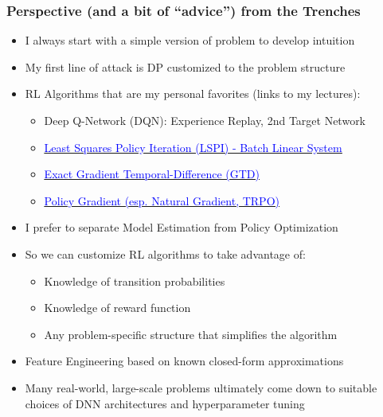 \documentclass[handout]{beamer}
\begin{document}
\begin{frame}
\frametitle{Perspective (and a bit of ``advice'') from the Trenches}
\pause
\begin{itemize}[<+->]
\item I always start with a simple version of problem to develop intuition
\item My first line of attack is DP customized to the problem structure
\item RL Algorithms that are my personal favorites (links to my lectures):
\begin{itemize}
\item Deep Q-Network (DQN): Experience Replay, 2nd Target Network
\item \href{https://github.com/coverdrive/technical-documents/blob/master/finance/cme241/ValueFunctionGeometry.pdf}{\underline{\textcolor{blue}{Least Squares Policy Iteration (LSPI) - Batch Linear System}}}
\item \href {https://github.com/coverdrive/technical-documents/blob/master/finance/cme241/ValueFunctionGeometry.pdf}{\underline{\textcolor{blue}{Exact Gradient Temporal-Difference (GTD)}}}
\item \href{https://github.com/coverdrive/technical-documents/blob/master/finance/cme241/PolicyGradient.pdf}{\underline{\textcolor{blue}{Policy Gradient (esp. Natural Gradient, TRPO)}}}
\end{itemize}
\item I prefer to separate Model Estimation from Policy Optimization
\item So we can customize RL algorithms to take advantage of:
\begin{itemize}
\item Knowledge of transition probabilities
\item Knowledge of reward function
\item Any problem-specific structure that simplifies the algorithm
\end{itemize}
\item Feature Engineering based on known closed-form approximations
\item Many real-world, large-scale problems ultimately come down to
suitable choices of DNN architectures and hyperparameter tuning \frownie
\end{itemize}
\end{frame}
\end{document}

